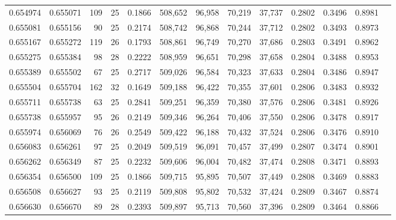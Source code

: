 \begin{tabular}{rrrrrrrrrrrrr}
0.654974 & 0.655071 &   109 &  25 &                                     0.1866 & 508,652 &  96,958 &  70,219 &  37,737 & 0.2802 & 0.3496 & 0.8981 \\
0.655081 & 0.655156 &    90 &  25 &                                     0.2174 & 508,742 &  96,868 &  70,244 &  37,712 & 0.2802 & 0.3493 & 0.8973 \\
0.655167 & 0.655272 &   119 &  26 &                                     0.1793 & 508,861 &  96,749 &  70,270 &  37,686 & 0.2803 & 0.3491 & 0.8962 \\
0.655275 & 0.655384 &    98 &  28 &                                     0.2222 & 508,959 &  96,651 &  70,298 &  37,658 & 0.2804 & 0.3488 & 0.8953 \\
0.655389 & 0.655502 &    67 &  25 &                                     0.2717 & 509,026 &  96,584 &  70,323 &  37,633 & 0.2804 & 0.3486 & 0.8947 \\
0.655504 & 0.655704 &   162 &  32 &                                     0.1649 & 509,188 &  96,422 &  70,355 &  37,601 & 0.2806 & 0.3483 & 0.8932 \\
0.655711 & 0.655738 &    63 &  25 &                                     0.2841 & 509,251 &  96,359 &  70,380 &  37,576 & 0.2806 & 0.3481 & 0.8926 \\
0.655738 & 0.655957 &    95 &  26 &                                     0.2149 & 509,346 &  96,264 &  70,406 &  37,550 & 0.2806 & 0.3478 & 0.8917 \\
0.655974 & 0.656069 &    76 &  26 &                                     0.2549 & 509,422 &  96,188 &  70,432 &  37,524 & 0.2806 & 0.3476 & 0.8910 \\
0.656083 & 0.656261 &    97 &  25 &                                     0.2049 & 509,519 &  96,091 &  70,457 &  37,499 & 0.2807 & 0.3474 & 0.8901 \\
0.656262 & 0.656349 &    87 &  25 &                                     0.2232 & 509,606 &  96,004 &  70,482 &  37,474 & 0.2808 & 0.3471 & 0.8893 \\
0.656354 & 0.656500 &   109 &  25 &                                     0.1866 & 509,715 &  95,895 &  70,507 &  37,449 & 0.2808 & 0.3469 & 0.8883 \\
0.656508 & 0.656627 &    93 &  25 &                                     0.2119 & 509,808 &  95,802 &  70,532 &  37,424 & 0.2809 & 0.3467 & 0.8874 \\
0.656630 & 0.656670 &    89 &  28 &                                     0.2393 & 509,897 &  95,713 &  70,560 &  37,396 & 0.2809 & 0.3464 & 0.8866 \\

\end{tabular}
